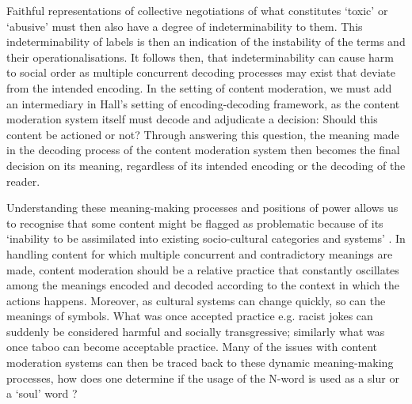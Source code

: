 Faithful representations of collective negotiations of what constitutes `toxic' or `abusive' must then also have a degree of indeterminability to them. This indeterminability of labels is then an indication of the instability of the terms and their operationalisations. It follows then, that indeterminability can cause harm to social order \cite{Hall:1997} as multiple concurrent decoding processes may exist that deviate from the intended encoding. In the setting of content moderation, we must add an intermediary in Hall's \cite{Hall:1997} setting of encoding-decoding framework, as the content moderation system itself must decode and adjudicate a decision: Should this content be actioned or not? Through answering this question, the meaning made in the decoding process of the content moderation system then becomes the final decision on its meaning, regardless of its intended encoding or the decoding of the reader.

Understanding these meaning-making processes and positions of power allows us to recognise that some content might be flagged as problematic because of its `inability to be assimilated into existing socio-cultural categories and systems' \cite{Rafi:2015}. In handling content for which multiple concurrent and contradictory meanings are made, content moderation should be a relative practice that constantly oscillates among the meanings encoded and decoded according to the context in which the actions happens. Moreover, as cultural systems can change quickly, so can the meanings of symbols. What was once accepted practice e.g. racist jokes can suddenly be considered harmful and socially transgressive; similarly what was once taboo can become acceptable practice.
Many of the issues with content moderation systems can then be traced back to these dynamic meaning-making processes, how does one determine if the usage of the N-word is used as a slur or a `soul' word \cite{Rahman:2012}?\vspace{5mm}

